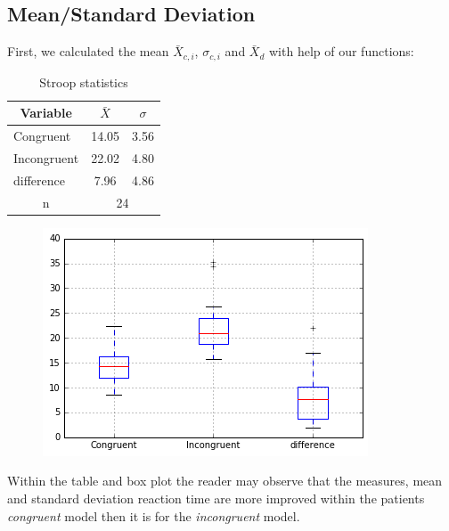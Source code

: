 \documentclass[8pt]{article}
\newcommand{\8}{\bar}
\begin{document}
\subsection{Mean/Standard Deviation} 
First, we calculated the mean $\bar{X}_{c,i}$, $\sigma_{c,i}$ and $\bar{X}_{d}$ with help of our functions: 
\begin{table}[htbp]\centering \caption{Stroop statistics \label{sumstat}}
\begin{tabular}{l c c  }\hline\hline
\multicolumn{1}{c}{\textbf{Variable}} & $\bar{X}$ & $\sigma$ \\ \hline
Congruent & 14.05 & 3.56  \\
Incongruent & 22.02 & 4.80  \\
difference & 7.96 & 4.86 \\ 
\multicolumn{1}{c}{n} & \multicolumn{2}{c}{24}\\ \hline
\end{tabular}
\end{table}
\begin{figure}[H]
	\includegraphics[scale=.5]{box_plot.png}
\end{figure}
Within the table and box plot the reader may observe that the measures, mean and standard deviation reaction time are more improved within the patients \textit{congruent} model then it is for the \textit{incongruent} model. 
\end{document}
